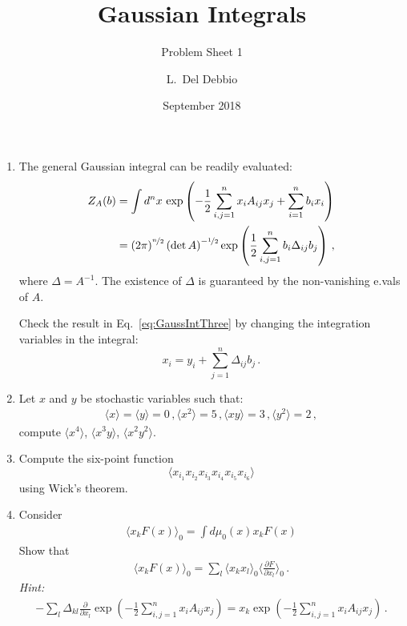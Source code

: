 \documentclass{tutorial}
\subtitle{Problem Sheet 1}
\title{Gaussian Integrals}
\author{L.~Del Debbio}
\date{September 2018}
\begin{document}
\maketitle

\begin{enumerate}

\item The general Gaussian integral can be readily evaluated:
  \begin{align}
    Z_A(b) &= \int d^nx\, \exp\left(
             -\frac12 \sum_{i,j=1}^n x_i A_{ij} x_j
             + \sum_{i=1}^n b_i x_i
             \right) \\
    \label{eq:GaussIntThree}
           &=  \left(2\pi\right)^{\nicefrac{n}{2}} \left(\det A \right)^{-\nicefrac{1}{2}}
             \exp\left(
             \frac12 \sum_{i,j=1}^n b_i \Delta_{ij} b_j
             \right) \, ,
  \end{align}
  where $\Delta = A^{-1}$. The existence of $\Delta$ is guaranteed by
  the non-vanishing e.vals of $A$.

  Check the result in Eq.~\ref{eq:GaussIntThree} by changing the
  integration variables in the integral:
  \[
    x_i = y_i + \sum_{j=1}^n \Delta_{ij} b_j\, .
  \]

\item Let $x$ and $y$ be stochastic variables such that:
  \begin{align*}
    \langle x \rangle = \langle y \rangle =0\, ,
    \langle x^2 \rangle = 5\, ,
    \langle x y \rangle = 3 \, ,
    \langle y^2 \rangle = 2\, ,
  \end{align*}
  compute $\langle x^4\rangle$, $\langle x^3 y \rangle$, $\langle x^2
  y^2\rangle$.  

\item Compute the six-point function
  \[
    \langle x_{i_1} x_{i_2} x_{i_3} x_{i_4} x_{i_5} x_{i_6} \rangle    
  \]
  using Wick's theorem. 

\item Consider 
  \begin{align}
    \langle x_k F(x) \rangle_0 = 
    \int d\mu_0(x) x_k F(x) 
  \end{align}
  Show that
  \begin{align}
    \langle x_k F(x) \rangle_0  = 
    \sum_l \langle x_k x_l \rangle_0 \langle \frac{\partial F}{\partial x_l}\rangle_0\, .
  \end{align}
  {\em Hint:} 
  \begin{align}
    - \sum_l \Delta_{kl} \frac{\partial}{\partial x_l}
    \exp\left(
    -\frac12 \sum_{i,j=1}^n x_i A_{ij} x_j
    \right) = 
    x_k \exp\left(
    -\frac12 \sum_{i,j=1}^n x_i A_{ij} x_j
    \right)\, .
  \end{align}


\end{enumerate}
\end{document}
